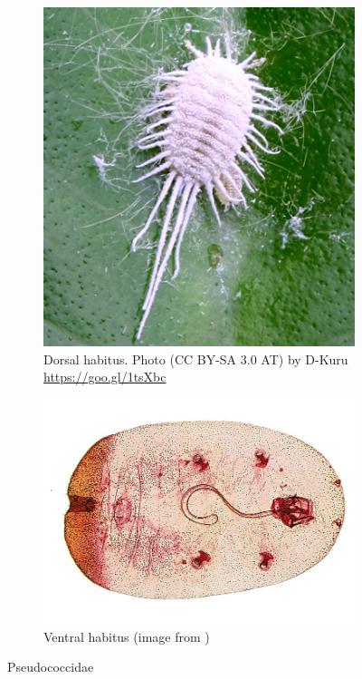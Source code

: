 \documentclass[letterpaper, 11pt]{article}
\begin{document}
\begin{figure}[ht!]
 \centering
 \begin{subfigure}[ht!]{0.38\textwidth}
  \includegraphics[width=\textwidth]{PseudococcidDorsalHabitus}
  \caption{Dorsal habitus. Photo (CC BY-SA 3.0 AT) by D-Kuru \url{https://goo.gl/1tsXbc}}
  \label{fig:pseudococcid1}
 \end{subfigure}
 \qquad
 \begin{subfigure}[ht!]{0.45\textwidth}
  \includegraphics[width=\textwidth]{PseudococcidHabitus}
  \caption{Ventral habitus (image from \cite{ScaleNet})}
  \label{fig:pseudococcid2}
 \end{subfigure}
 \caption{Pseudococcidae}\label{fig:pseudococcid}
\end{figure}
\end{document}
